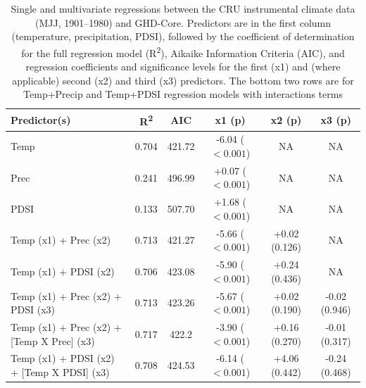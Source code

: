 \documentclass[12pt]{article}
\begin{document}
\begin{table}
\small
\caption{\small Single and multivariate regressions between the CRU instrumental climate data (MJJ, 1901--1980) and GHD-Core. Predictors are in the first column (temperature, precipitation, PDSI), followed by the coefficient of determination for the full regression model (R\textsuperscript{2}), Aikaike Information Criteria (AIC), and regression coefficients and significance levels for the first (x1) and (where applicable) second (x2) and third (x3) predictors. The bottom two rows are for Temp+Precip and Temp+PDSI regression models with interactions terms}
\centering
\begin{tabular}{l c c c c c}
\hline
Predictor(s) & R\textsuperscript{2} & AIC & x1 (p) & x2 (p) & x3 (p)\\
\hline
Temp & 0.704 & 421.72 & -6.04 ($<0.001$) & NA & NA\\
Prec	 & 0.241 & 496.99 & +0.07 ($<0.001$) & NA & NA\\
PDSI & 0.133 & 507.70 & +1.68 ($<0.001$) & NA & NA\\
\hline
Temp (x1) + Prec (x2) & 0.713 & 421.27 & -5.66 ($<0.001$) & +0.02 (0.126) & NA\\
Temp (x1) + PDSI (x2) & 0.706 & 423.08 & -5.90 ($<0.001$) & +0.24 (0.436) & NA\\
Temp (x1) + Prec (x2) + PDSI (x3)	& 0.713 & 423.26 & -5.67 ($<0.001$) & +0.02 (0.190) & -0.02 (0.946)\\
Temp (x1) + Prec (x2) + [Temp X Prec] (x3)	& 0.717 & 422.2 & -3.90 ($<0.001$) & +0.16 (0.270) & -0.01 (0.317)\\
Temp (x1) + PDSI (x2) + [Temp X PDSI] (x3) & 0.708 & 424.53 & -6.14 ($<0.001$) & +4.06 (0.442) & -0.24 (0.468)\\
\hline
\end{tabular}
\end{table}
\end{document}
